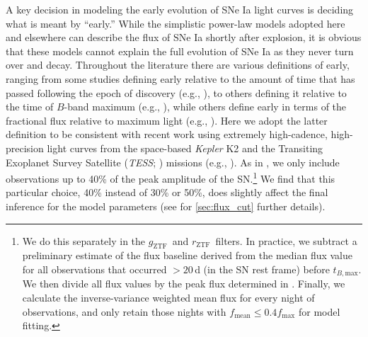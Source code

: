 \documentclass[twocolumn]{aastex63}
\newcommand{\rztf}{$r_\mathrm{ZTF}$}
\newcommand{\gztf}{$g_\mathrm{ZTF}$}
\newcommand{\tbmax}{$t_{B,\mathrm{max}}$}
\begin{document}
A key decision in modeling the early evolution of SNe Ia light curves is
deciding what is meant by ``early.'' While the simplistic power-law models
adopted here and elsewhere can describe the flux of SNe Ia shortly after
explosion, it is obvious that these models cannot explain the full evolution
of SNe Ia as they never turn over and decay. Throughout the literature there
are various definitions of early, ranging from some studies defining early
relative to the amount of time that has passed following the epoch of
discovery (e.g., \citealt{Nugent11,Zheng13,Miller18}), to others defining it
relative to the time of $B$-band maximum (e.g.,
\citealt{Riess99a,Aldering00,Conley06,Dimitriadis19}), while others define
early in terms of the fractional flux relative to maximum light (e.g.,
\citealt{Olling15,Firth15,Fausnaugh19}). Here we adopt the latter definition
to be consistent with recent work using extremely high-cadence, high-precision
light curves from the space-based \textit{Kepler} K2 \citep{Howell14} and the
Transiting Exoplanet Survey Satellite (\textit{TESS}; \citealt{Ricker15})
missions (e.g., \citealt{Olling15,Fausnaugh19}). As in \citet{Olling15}, we
only include observations up to 40\% of the peak amplitude of the
SN.\footnote{We do this separately in the \gztf\ and \rztf\ filters. In
practice, we subtract a preliminary estimate of the flux baseline derived from
the median flux value for all observations that occurred $>20$\,d (in the SN
rest frame) before \tbmax. We then divide all flux values by the peak flux
determined in \citet{Yao19}. Finally, we calculate the inverse-variance
weighted mean flux for every night of observations, and only retain those
nights with $f_\mathrm{mean} \le 0.4 f_\mathrm{max}$ for model fitting.} We
find that this particular choice, 40\% instead of 30\% or 50\%, does slightly
affect the final inference for the model parameters (see for
\ref{sec:flux_cut} further details).
\end{document}
